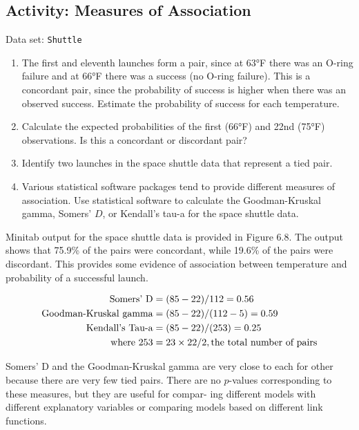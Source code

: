\documentclass[
]{book}
\begin{document}
\hypertarget{activity-measures-of-association}{%
\subsection*{Activity: Measures of Association}\label{activity-measures-of-association}}

Data set: \texttt{Shuttle}

\begin{enumerate}
\def\labelenumi{\arabic{enumi}.}
\setcounter{enumi}{18}
\item
  The first and eleventh launches form a pair, since at 63°F there was an O-ring failure and at 66°F there was a success (no O-ring failure). This is a concordant pair, since the probability of success is higher when there was an observed success. Estimate the probability of success for each temperature.
\item
  Calculate the expected probabilities of the first (66°F) and 22nd (75°F) observations. Is this a concordant or discordant pair?
\item
  Identify two launches in the space shuttle data that represent a tied pair.
\item
  Various statistical software packages tend to provide different measures of association. Use statistical software to calculate the Goodman-Kruskal gamma, Somers' \(D\), or Kendall's tau-a for the space shuttle data.
\end{enumerate}

Minitab output for the space shuttle data is provided in Figure 6.8. The output shows that 75.9\% of the pairs were concordant, while 19.6\% of the pairs were discordant. This provides some evidence of association between temperature and probability of a successful launch.

\begin{align}
\text{Somers’ D} &= (85 - 22)/112 = 0.56 \notag \\
\text{Goodman-Kruskal gamma} &= (85 - 22)/(112 - 5) = 0.59 \notag \\
\text{Kendall’s Tau-a} &= (85 - 22)/(253) = 0.25 \notag \\
\text{where } 253 &= 23 \times 22/2, \text{the total number of pairs} \notag
\end{align}

Somers' D and the Goodman-Kruskal gamma are very close to each for other because there are very
few tied pairs. There are no \(p\)-values corresponding to these measures, but they are useful for compar-
ing different models with different explanatory variables or comparing models based on different link
functions.
\end{document}

